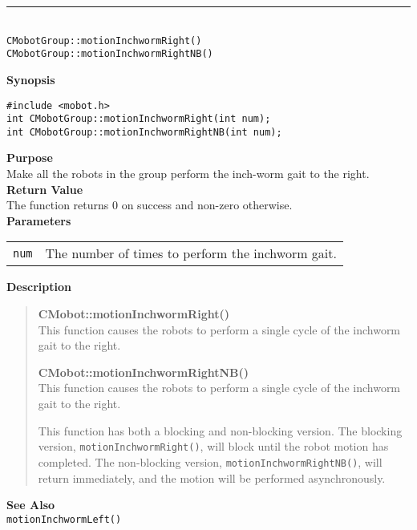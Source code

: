 \noindent
\vspace{5pt}
\rule{4.5in}{0.015in}\\
\noindent
{\LARGE \texttt{CMobotGroup::motionInchwormRight()}}\\
{\LARGE \texttt{CMobotGroup::motionInchwormRightNB()}}\\
{}

\noindent
{\bf Synopsis}
\vspace{-8pt}
\begin{verbatim}
#include <mobot.h>
int CMobotGroup::motionInchwormRight(int num);
int CMobotGroup::motionInchwormRightNB(int num);
\end{verbatim}

\noindent
{\bf Purpose}\\
Make all the robots in the group perform the inch-worm gait to the right.\\

\noindent
{\bf Return Value}\\
The function returns 0 on success and non-zero otherwise.\\

\noindent
{\bf Parameters}\\
\vspace{-0.1in}
\begin{description}
\item               
\begin{tabular}{p{15 mm}p{145 mm}}
\texttt{num} & The number of times to perform the inchworm gait.\\
\end{tabular}
\end{description}

\noindent
{\bf Description}\\
\vspace{-12pt}
\begin{quote}
{\bf CMobot::motionInchwormRight()}\\
This function causes the robots to perform a single cycle of the inchworm gait
to the right. 

{\bf CMobot::motionInchwormRightNB()}\\
This function causes the robots to perform a single cycle of the inchworm gait
to the right. 

This function has both a blocking and non-blocking version.
The blocking version, \texttt{motionInchwormRight()}, will block until the
robot motion has completed. The non-blocking version, \texttt{motionInchwormRightNB()},
will return immediately, and the motion will be performed asynchronously.\\
\end{quote}

\noindent
{\bf See Also}\\
\texttt{motionInchwormLeft()}

